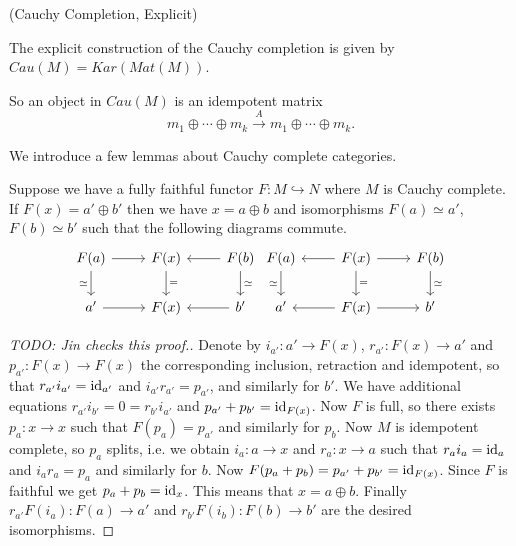 \begin{definition} \label{definition/cauchy-completion/explicit} (Cauchy Completion, Explicit)

  The explicit construction of the Cauchy completion is given by $Cau(M)=Kar(Mat(M))$. \end{definition}

\noindent So an object in $Cau(M)$ is an idempotent matrix $$m_1\oplus\cdots\oplus m_k \xrightarrow{A} m_1\oplus\cdots\oplus m_k.$$

\noindent We introduce a few lemmas about Cauchy complete categories.

\begin{lemma}\label{direct_sum}
  Suppose we have a fully faithful functor $F:M\hookrightarrow N$ where $M$ is
  Cauchy complete. If $F(x)=a'\oplus b'$ then we have $x=a\oplus b$ and
  isomorphisms $F(a)\simeq a'$, $F(b)\simeq b'$ such that the following
  diagrams commute.
  \[
    \begin{tikzcd}
      {F(a)} & {F(x)} & {F(b)} \\
      {a'} & {F(x)} & {b'}
      \arrow[from=1-1, to=1-2]
      \arrow["\simeq"', from=1-1, to=2-1]
      \arrow["{=}", from=1-2, to=2-2]
      \arrow[from=1-3, to=1-2]
      \arrow["\simeq", from=1-3, to=2-3]
      \arrow[from=2-1, to=2-2]
      \arrow[from=2-3, to=2-2]
    \end{tikzcd} \begin{tikzcd}
      {F(a)} & {F(x)} & {F(b)} \\
      {a'} & {F(x)} & {b'}
      \arrow["\simeq"', from=1-1, to=2-1]
      \arrow[from=1-2, to=1-1]
      \arrow[from=1-2, to=1-3]
      \arrow["{=}", from=1-2, to=2-2]
      \arrow["\simeq", from=1-3, to=2-3]
      \arrow[from=2-2, to=2-1]
      \arrow[from=2-2, to=2-3]
    \end{tikzcd}
  \]
\end{lemma}

\begin{proof}
  [TODO: Jin checks this proof.]

  Denote by $i_{a'}:a'\to F(x)$, $r_{a'}:F(x)\to a'$ and $p_{a'}:F(x)\to F(x)$
  the corresponding inclusion, retraction and idempotent, so that
  $r_{a'}i_{a'}=\operatorname{id}_{a'}$ and $i_{a'} r_{a'}=p_{a'}$, and similarly for $b'$.
  We have additional equations $r_{a'}i_{b'}=0=r_{b'}i_{a'}$ and
  $p_{a'}+p_{b'}=\operatorname{id}_{F(x)}$. Now $F$ is full, so there exists $p_a:x\to x$
  such that $F(p_a)=p_{a'}$ and similarly for $p_b$. Now $M$ is idempotent
  complete, so $p_a$ splits, i.e. we obtain $i_a:a\to x$ and $r_a:x\to a$ such
  that $r_a i_a=\operatorname{id}_a$ and $i_a r_a=p_a$ and similarly for $b$. Now
  $F(p_a+p_b)=p_{a'}+p_{b'}=\operatorname{id}_{F(x)}$. Since $F$ is faithful we get
  $p_a+p_b=\operatorname{id}_x$. This means that $x=a\oplus b$. Finally
  $r_{a'}F(i_a):F(a)\to a'$ and $r_{b'}F(i_b):F(b)\to b'$ are the desired
  isomorphisms.
\end{proof}

